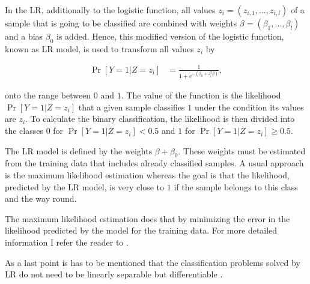 In the \ac{LR}, additionally to the logistic function, all values $z_i = (z_{i,1}, ...,z_{i,l})$ of a sample that is going to be classified are combined with weights $\beta =(\beta_1, ..., \beta_l)$ and a bias $\beta_0$ is added. %
Hence, this modified version of the logistic function, known as \ac{LR} model, is used to transform all values $z_i$ by 

\begin{align*}
\Pr[Y = 1 | Z = z_i] &= \frac{1}{1 + e^{-(\beta_0 + z^T_i \beta)}},
\end{align*}

onto the range between $0$ and $1$.
The value of the function is the likelihood $\Pr[Y = 1 | Z = z_i]$ that a given sample classifies $1$ under the condition its values are $z_i$.
To calculate the binary classification, the likelihood is then divided into the classes $0$ for $\Pr[Y = 1 | Z = z_i] < 0.5$ and $1$ for $\Pr[Y = 1 | Z = z_i] \ge 0.5$. %

The \ac{LR} model is defined by the weights $\beta + \beta_0$. %
These weights must be estimated from the training data that includes already classified samples.
A usual approach is the maximum likelihood estimation whereas the goal is that the likelihood, predicted by the \ac{LR} model, is very close to $1$ if the sample belongs to this class and the way round. %

The maximum likelihood estimation does that by minimizing the error in the likelihood predicted by the model for the training data. %
For more detailed information I refer the reader to \cite{Aldrich1997RA1922}.

As a last point is has to be mentioned that the classification problems solved by \ac{LR} do not need to be linearly separable but differentiable \cite{Ruhrmair2010ModelingFunctions}.


